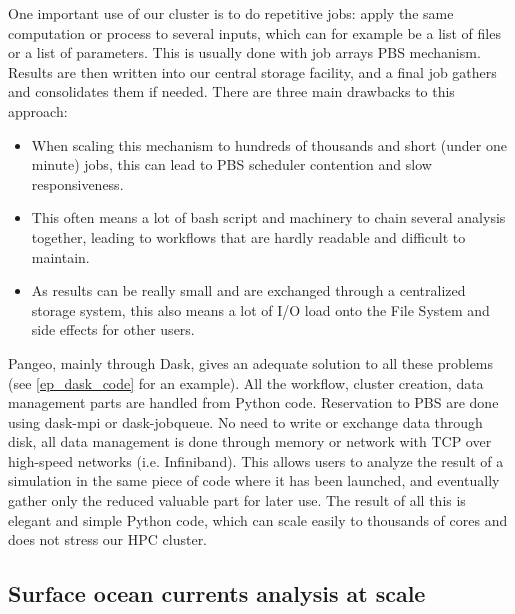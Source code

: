 \documentclass{article}
\begin{document}
One important use of our cluster is to do repetitive jobs: apply the same computation or process to several inputs, which can for example be a list of files or a list of parameters. This is usually done with job arrays PBS mechanism. Results are then written into our central storage facility, and a final job gathers and consolidates them if needed. There are three main drawbacks to this approach:
\begin{itemize}
\item When scaling this mechanism to hundreds of thousands and short (under one minute) jobs, this can lead to PBS scheduler contention and slow responsiveness.
\item This often means a lot of bash script and machinery to chain several analysis together, leading to workflows that are hardly readable and difficult to maintain.
\item As results can be really small and are exchanged through a centralized storage system, this also means a lot of I/O load onto the File System and side effects for other users.
\end{itemize}

Pangeo, mainly through Dask, gives an adequate solution to all these problems (see \ref{ep_dask_code} for an example). All the workflow, cluster creation, data management parts are handled from Python code. Reservation to PBS are done using dask-mpi or dask-jobqueue. No need to write or exchange data through disk, all data management is done through memory or network with TCP over high-speed networks (i.e. Infiniband). This allows users to analyze the result of a simulation in the same piece of code where it has been launched, and eventually gather only the reduced valuable part for later use. The result of all this is elegant and simple Python code, which can scale easily to thousands of cores and does not stress our HPC cluster.

\subsection{Surface ocean currents analysis at scale}
\label{ssec:usecase3}
\end{document}
